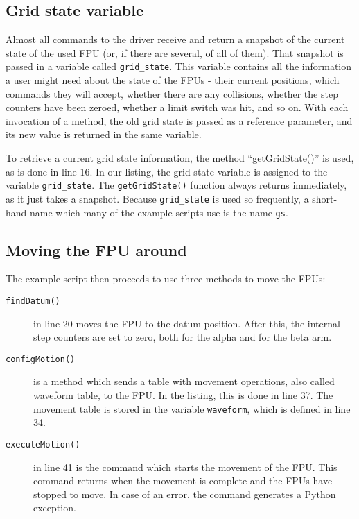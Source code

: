\documentclass{scrartcl}[12pt,a4paper]
\begin{document}
\subsection{Grid state variable}

Almost all commands to the driver receive and return a snapshot of the
current state of the used FPU (or, if there are several, of all of
them). That snapshot is passed in a variable called
\texttt{grid\_state}. This variable contains all the information a
user might need about the state of the FPUs - their current positions,
which commands they will accept, whether there are any collisions,
whether the step counters have been zeroed, whether a limit switch was
hit, and so on. With each invocation of a method, the old grid state
is passed as a reference parameter, and its new value is returned in
the same variable.

To retrieve a current grid state information, the method
``getGridState()'' is used, as is done in line 16. In our listing, the
grid state variable is assigned to the variable \texttt{grid\_state}.
The \texttt{getGridState()} function always returns immediately, as it
just takes a snapshot. Because \texttt{grid\_state} is used so
frequently, a short-hand name which many of the example scripts use is
the name \texttt{gs}.

\subsection{Moving the FPU around}

The example script then proceeds to use three methods to move
the FPUs:

\begin{description}
\item[\texttt{findDatum()}] in line 20 moves the FPU to the datum
  position. After this, the internal step counters are set to zero,
  both for the alpha and for the beta arm.

\item[\texttt{configMotion()}] is a method which sends a table with movement
  operations, also called waveform table, to the FPU. In the listing,
  this is done in line 37. The movement table is stored in the
  variable \texttt{waveform}, which is defined in line 34.

\item[\texttt{executeMotion()}] in line 41 is the command which starts
  the movement of the FPU. This command returns when the movement is
  complete and the FPUs have stopped to move. In case of an error, the
  command generates a Python exception.

\end{description}
\end{document}
